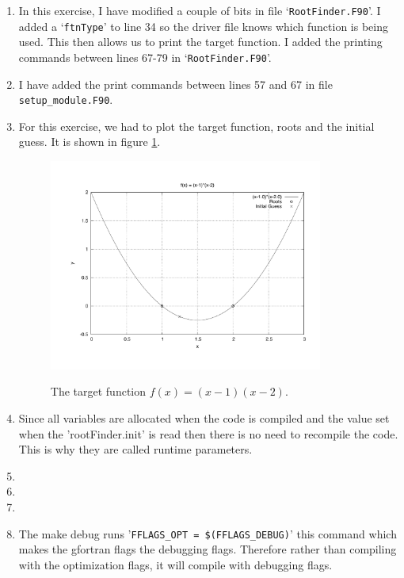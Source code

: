 \documentclass[12pt]{article}
\begin{document}
\begin{enumerate}
	\item In this exercise, I have modified a couple of bits in file `\texttt{RootFinder.F90}'. I added a `\texttt{ftnType}' to line 34 so the driver file knows which function is being used. This then allows us to print the target function. I added the printing commands between lines 67-79 in `\texttt{RootFinder.F90}'.
	
	\item I have added the print commands between lines 57 and 67 in file \texttt{setup\_module.F90}.
	
	\item For this exercise, we had to plot the target function, roots and the initial guess. It is shown in figure \ref{fig:plot2dot3}.
			\begin{figure}[h]
				\caption{The target function $f(x) = (x-1)(x-2)$.}
				\centering
				\includegraphics[width=0.85\textwidth]{./problem2_3.pdf}
				\label{fig:plot2dot3}
			\end{figure}
	
	\item Since all variables are allocated when the code is compiled and the value set when the 'rootFinder.init' is read then there is no need to recompile the code. This is why they are called runtime parameters.
	
	
	\item
	
	\item
	
	\item 
	
	\item The make debug runs '\texttt{FFLAGS\_OPT = \$(FFLAGS\_DEBUG)}' this command which makes the gfortran flags the debugging flags. Therefore rather than compiling with the optimization flags, it will compile with debugging flags. 
	
	
\end{enumerate}
\end{document}
